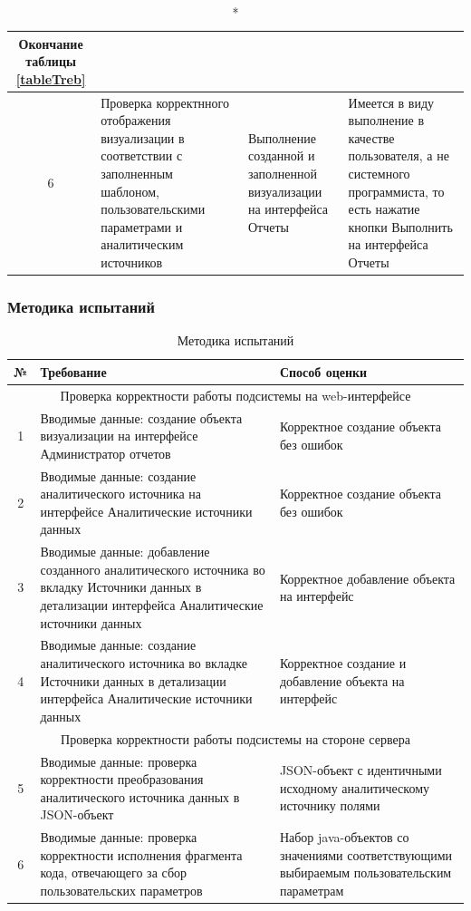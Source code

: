 \documentclass[a4paper]{extarticle}
\numberwithin{equation}{section}
\begin{document}
\begin{longtable}[H]{|c|p{}|p{}|p{}|}
  	\caption*{Окончание таблицы \ref{tableTreb}} \\\hline
  6  & Проверка корректнного отображения визуализации в соответствии с заполненным шаблоном, пользовательскими параметрами и аналитическим источников & Выполнение созданной и заполненной визуализации на интерфейса Отчеты & Имеется в виду выполнение в качестве пользователя, а не системного программиста, то есть нажатие кнопки Выполнить на интерфейса Отчеты\\\hline
\end{longtable}\par

\newpage
\subsubsection{Методика испытаний}
\begin{longtable}[H]{|c|p{}|p{}|}
  \caption{Методика испытаний}
  \label{tableMetod} \\\hline
  №  & Требование & Способ оценки \\\hline
  \multicolumn{3}{|c|}{Проверка корректности работы подсистемы на web-интерфейсе} \\\hline
  1  & Вводимые данные: создание объекта визуализации на интерфейсе Администратор отчетов & Корректное создание объекта без ошибок \\\hline
  2  & Вводимые данные: создание аналитического источника на интерфейсе Аналитические источники данных & Корректное создание объекта без ошибок \\\hline
  3  & Вводимые данные: добавление созданного аналитического источника во вкладку Источники данных в детализации интерфейса Аналитические источники данных & Корректное добавление объекта на интерфейс \\\hline
  4  & Вводимые данные: создание аналитического источника во вкладке Источники данных в детализации интерфейса Аналитические источники данных & Корректное создание и добавление объекта на интерфейс \\\hline
  \multicolumn{3}{|c|}{Проверка корректности работы подсистемы на стороне сервера} \\\hline
  5  & Вводимые данные: проверка корректности преобразования аналитического источника данных в JSON-объект & JSON-объект с идентичными исходному аналитическому источнику полями \\\hline
  6  & Вводимые данные: проверка корректности исполнения фрагмента кода, отвечающего за сбор пользовательских параметров & Набор java-объектов со значениями соответствующими выбираемым пользовательским параметрам \\

\end{longtable}
\end{document}
